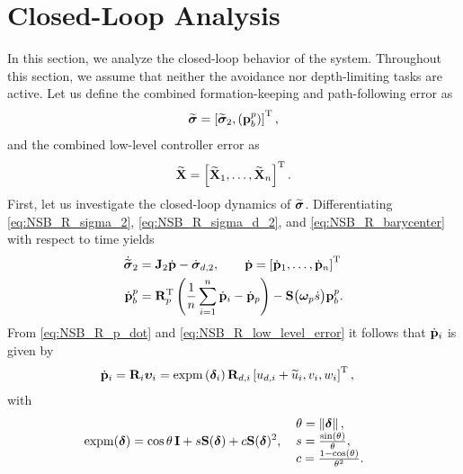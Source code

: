 \section{Closed-Loop Analysis}
\label{sec:NSB_R_path_stability}

In this section, we analyze the closed-loop behavior of the system.
Throughout this section, we assume that neither the avoidance nor depth-limiting tasks are active.
Let us define the combined formation-keeping and path-following error as 
\begin{equation}
    \widetilde{\bm{\sigma}} = \left[\widetilde{\bm{\sigma}}_2, \left(\mathbf{p}_b^p\right)\right]^{\mathrm{T}},
\end{equation}
and the combined low-level controller error as
\begin{equation}
    \widetilde{\mathbf{X}} = \left[\widetilde{\mathbf{X}}_1, \ldots, \widetilde{\mathbf{X}}_n\right]^{\mathrm{T}}.
\end{equation}
First, let us investigate the closed-loop dynamics of $\widetilde{\bm{\sigma}}$.
Differentiating \eqref{eq:NSB_R_sigma_2}, \eqref{eq:NSB_R_sigma_d_2}, and \eqref{eq:NSB_R_barycenter} with respect to time yields 
\begin{subequations}
\begin{align}
    \dot{\widetilde{\bm{\sigma}}}_2 &= \mathbf{J}_2\dot{\mathbf{p}} - \dot{\bm{\sigma}}_{d, 2}, \qquad \dot{\mathbf{p}} = \left[\dot{\mathbf{p}}_1, \ldots, \dot{\mathbf{p}}_n\right]^{\mathrm{T}} \\
    \dot{\mathbf{p}}_b^p &= \mathbf{R}_p^{\mathrm{T}}\left(\frac{1}{n}\sum_{i=1}^n\dot{\mathbf{p}}_i - \dot{\mathbf{p}}_p\right) - \mathbf{S}\big(\bm{\omega}_p\dot{s}\big)\mathbf{p}_b^p.
\end{align} \label{eq:NSB_R_dot_sigma_tilde}
\end{subequations}
From \eqref{eq:NSB_R_p_dot} and \eqref{eq:NSB_R_low_level_error} it follows that $\dot{\mathbf{p}}_i$ is given by 
\begin{align}
    \dot{\mathbf{p}}_i &= \mathbf{R}_i\bm{\upsilon}_i = {\rm expm}\left(\bm{\delta}_i\right)\mathbf{R}_{d, i}\left[u_{d, i} + \widetilde{u}_i, v_i, w_i\right]^{\mathrm{T}}, \label{eq:NSB_R_p_dot_closed_loop}
\end{align}
with 
\begin{align}
    {\rm expm}(\bs{\delta}) &= \cos\theta\,\mat{I} + s\mat{S}(\bs{\delta}) + c\mat{S}(\bs{\delta})^2\mathrlap{,} &
    &\begin{array}{l}
    \scale[1]{\theta = \norm{\bs{\delta}},} \\
    \scale[1]{s = \frac{\sin(\theta)}{\theta},} \\
    \scale[1]{c = \frac{1 - \cos(\theta)}{\theta^2}.}
    \end{array} \label{eq:NSB_R_expm}
\end{align}
